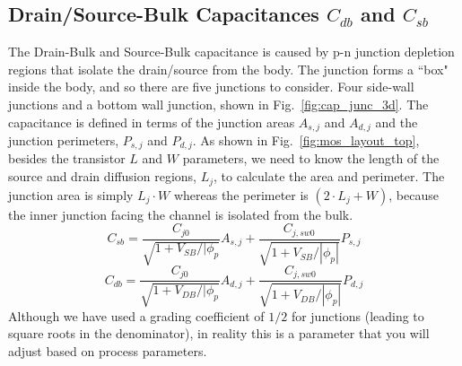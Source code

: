 \subsection{Drain/Source-Bulk Capacitances $C_{db}$ and $C_{sb}$}
The Drain-Bulk and Source-Bulk capacitance is caused by p-n junction depletion regions that isolate the drain/source from the body. The junction forms a ``box" inside the body, and so there are five junctions to consider. Four side-wall junctions and a bottom wall junction, shown in Fig.~\ref{fig:cap_junc_3d}.  The capacitance is defined in terms of the junction areas $A_{s,j}$ and $A_{d,j}$ and the junction perimeters, $P_{s,j}$ and $P_{d,j}$.  As shown in  Fig.~\ref{fig:mos_layout_top}, besides the transistor $L$ and $W$ parameters, we need to know the length of the source and drain diffusion regions, $L_j$, to calculate the area and perimeter.  The junction area is simply $L_j \cdot W$ whereas the perimeter is $(2\cdot L_j + W)$, because the inner junction facing the channel is isolated from the bulk.
\begin{equation}
   C_{sb} = \frac{C_{j0}}{\sqrt{ 1 + V_{SB}/|\phi_{p}}}  A_{s,j} + \frac{C_{j,sw0}}{\sqrt{ 1 + V_{SB}/|\phi_p|}} P_{s,j}
\end{equation}
\begin{equation}
   C_{db} = \frac{C_{j0}}{\sqrt{ 1 + V_{DB}/|\phi_{p}}}  A_{d,j} + \frac{C_{j,sw0}}{\sqrt{ 1 + V_{DB}/|\phi_p|}} P_{d,j}
\end{equation}
Although we have used a grading coefficient of $1/2$ for junctions (leading to square roots in the denominator), in reality this is a parameter that you will adjust based on process parameters.
